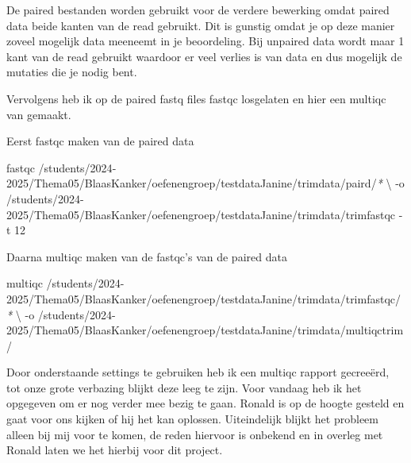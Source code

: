 \documentclass[
]{article}
\newenvironment{Shaded}{\begin{snugshade}}{\end{snugshade}}
\newcommand{\AttributeTok}[1]{\textcolor[rgb]{0.13,0.29,0.53}{#1}}
\newcommand{\DataTypeTok}[1]{\textcolor[rgb]{0.13,0.29,0.53}{#1}}
\newcommand{\ExtensionTok}[1]{#1}
\newcommand{\NormalTok}[1]{#1}
\newcommand{\PreprocessorTok}[1]{\textcolor[rgb]{0.56,0.35,0.01}{\textit{#1}}}
\begin{document}
De paired bestanden worden gebruikt voor de verdere bewerking omdat
paired data beide kanten van de read gebruikt. Dit is gunstig omdat je
op deze manier zoveel mogelijk data meeneemt in je beoordeling. Bij
unpaired data wordt maar 1 kant van de read gebruikt waardoor er veel
verlies is van data en dus mogelijk de mutaties die je nodig bent.

Vervolgens heb ik op de paired fastq files fastqc losgelaten en hier een
multiqc van gemaakt.

Eerst fastqc maken van de paired data

\begin{Shaded}
\begin{Highlighting}[]
\ExtensionTok{fastqc}\NormalTok{ /students/2024{-}2025/Thema05/BlaasKanker/oefenengroep/testdataJanine/trimdata/paird/}\PreprocessorTok{*} \DataTypeTok{\textbackslash{}}
    \AttributeTok{{-}o}\NormalTok{ /students/2024{-}2025/Thema05/BlaasKanker/oefenengroep/testdataJanine/trimdata/trimfastqc }\AttributeTok{{-}t}\NormalTok{ 12}
\end{Highlighting}
\end{Shaded}

Daarna multiqc maken van de fastqc's van de paired data

\begin{Shaded}
\begin{Highlighting}[]
\ExtensionTok{multiqc}\NormalTok{ /students/2024{-}2025/Thema05/BlaasKanker/oefenengroep/testdataJanine/trimdata/trimfastqc/}\PreprocessorTok{*} \DataTypeTok{\textbackslash{}}
    \AttributeTok{{-}o}\NormalTok{ /students/2024{-}2025/Thema05/BlaasKanker/oefenengroep/testdataJanine/trimdata/multiqctrim/}
\end{Highlighting}
\end{Shaded}

Door onderstaande settings te gebruiken heb ik een multiqc rapport
gecreeërd, tot onze grote verbazing blijkt deze leeg te zijn. Voor
vandaag heb ik het opgegeven om er nog verder mee bezig te gaan. Ronald
is op de hoogte gesteld en gaat voor ons kijken of hij het kan oplossen.
Uiteindelijk blijkt het probleem alleen bij mij voor te komen, de reden
hiervoor is onbekend en in overleg met Ronald laten we het hierbij voor
dit project.\\
\end{document}

